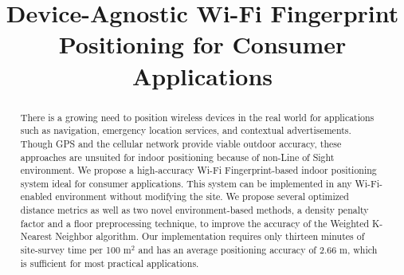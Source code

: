 \documentclass[conference]{IEEEtran}
\begin{document}
\title{Device-Agnostic Wi-Fi Fingerprint Positioning for Consumer Applications}

\author{
\and
{}
\and
{}
\and
{}
\and
{}
}

\maketitle

\begin{abstract}
There is a growing need to position wireless devices in the real world for applications such as navigation, emergency location services, and contextual advertisements. Though GPS and the cellular network provide viable outdoor accuracy, these approaches are unsuited for indoor positioning because of non-Line of Sight environment. We propose a high-accuracy Wi-Fi Fingerprint-based indoor positioning system ideal for consumer applications. This system can be implemented in any Wi-Fi-enabled environment without modifying the site. We propose several optimized distance metrics as well as two novel environment-based methods, a density penalty factor and a floor preprocessing technique, to improve the accuracy of the Weighted K-Nearest Neighbor algorithm. Our implementation requires only thirteen minutes of site-survey time per 100 m$^2$ and has an average positioning accuracy of 2.66 m, which is sufficient for most practical applications.
\end{abstract}

\IEEEpeerreviewmaketitle
\end{document}
